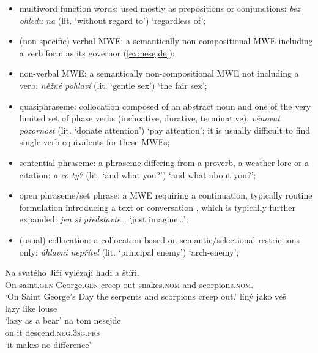 \documentclass[output=paper,colorlinks,citecolor=brown]{langscibook}
\begin{document}
\begin{itemize}
\begin{itemize}
    \item multiword function words: used mostly as prepositions or conjunctions: \emph{bez ohledu na} (lit. `without regard to') ‘regardless of’;


    \item (non-specific) verbal MWE: a semantically non-compositional MWE
including a verb form as its governor (\ref{ex:nesejde});
    \item non-verbal MWE: a semantically non-compositional MWE not
including a verb: \emph{něžné pohlaví} (lit. `gentle sex') ‘the fair sex’;


    \item quasiphraseme: 
    collocation composed of an abstract noun and one of the very limited set of phase verbs (inchoative, durative, terminative): \emph{věnovat pozornost} (lit. `donate attention') ‘pay attention’; it is usually difficult to find single-verb equivalents for these MWEs;
    
    \item sentential phraseme: a phraseme differing from a proverb, a weather
lore or a citation: \emph{a co ty?} (lit. `and what you?') ‘and what about you?’;
    \item open phraseme\slash set phrase: a MWE requiring a continuation, typically routine formulation introducing a text or conversation \citep{Coulmas:ed:1981, Aijmer:1996}, which is typically further expanded: \emph{jen si představte\ldots} ‘just imagine\ldots’;

    \item (usual) collocation: a collocation based on semantic/selectional 
    restrictions only: \emph{úhlavní nepřítel} (lit. `principal enemy') ‘arch-enemy’;

\end{itemize}

\ea \label{ex:jiri}
\gll 
Na svatého Jiří vylézají hadi a štíři.\\
On saint.\textsc{gen} George.\textsc{gen} {creep out} snakes.\textsc{nom} and scorpions.\textsc{nom}.\\
\glt ‘On Saint George's Day the serpents and scorpions creep out.’
\ex \label{ex:ves}
\gll líný jako veš\\
     lazy like louse\\
\glt `lazy as a bear'
\ex \label{ex:nesejde}
\gll na tom nesejde\\
     on it descend.\textsc{neg}.\textsc{3sg.prs}\\
\glt `it makes no difference'
\z


\end{itemize}
\end{document}
